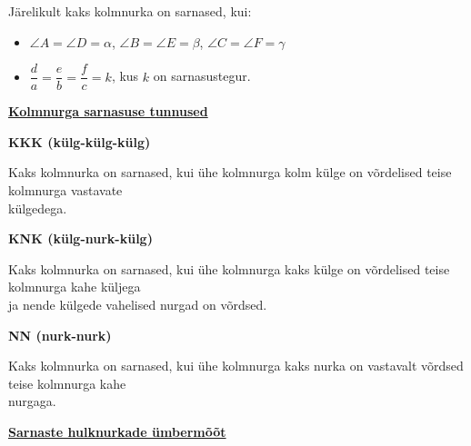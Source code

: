 \begin{center}
{{{\begin{flushleft}
\vspace{2mm}
\hspace{5mm}
Järelikult kaks kolmnurka on sarnased, kui:

\begin{itemize}
\item $\angle A = \angle D = \alpha$, $\angle B= \angle E= \beta$, $\angle C = \angle F= \gamma$
\item $\dfrac{d}{a}=\dfrac{e}{b}=\dfrac{f}{c}=k$, kus $k$ on sarnasustegur.
\end{itemize}


\vspace{2mm}
\hspace{5mm}
\textbf{\underline{Kolmnurga sarnasuse tunnused}}

\vspace{5mm}
\hspace{5mm}
\textbf{KKK (külg-külg-külg)}

\vspace{2mm}
\hspace{5mm}
Kaks kolmnurka on sarnased, kui ühe kolmnurga kolm külge on võrdelised teise kolmnurga vastavate\\ \hspace{5mm} külgedega.

\vspace{2mm}
\hspace{5mm}
\textbf{KNK (külg-nurk-külg)}

\vspace{2mm}
\hspace{5mm}
Kaks kolmnurka on sarnased, kui ühe kolmnurga kaks külge on võrdelised teise kolmnurga kahe küljega\\ \hspace{5mm} ja nende külgede vahelised nurgad on võrdsed.

\vspace{2mm}
\hspace{5mm}
\textbf{NN (nurk-nurk)}

\vspace{2mm}
\hspace{5mm}
Kaks kolmnurka on sarnased, kui ühe kolmnurga kaks nurka on vastavalt võrdsed teise kolmnurga kahe\\ \hspace{5mm} nurgaga.


\vspace{5mm}
\hspace{5mm}
\textbf{\underline{Sarnaste hulknurkade ümbermõõt}}


\end{flushleft}}}}
\end{center}
